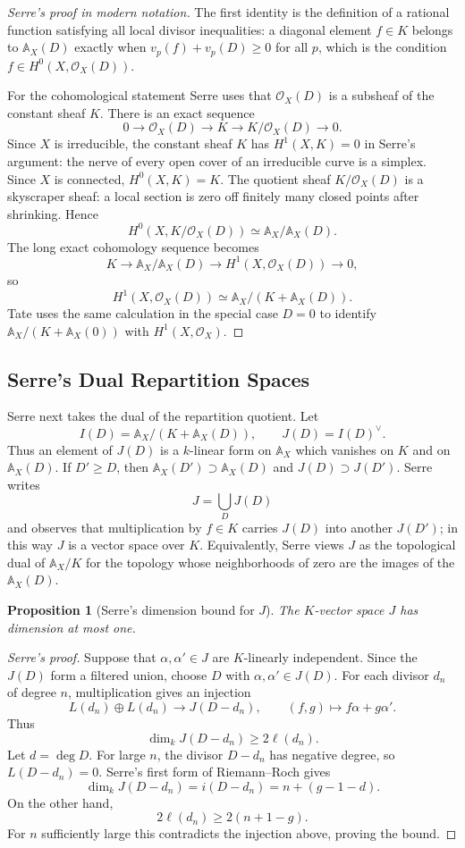 \documentclass[11pt,a4paper]{article}
\newcommand{\OO}{\mathcal O}
\newcommand{\AX}{\mathbb A_X}
\theoremstyle{definition}
\theoremstyle{plain}
\newtheorem{proposition}[definition]{Proposition}
\theoremstyle{remark}
\begin{document}
\begin{proof}[Serre's proof in modern notation]
The first identity is the definition of a rational function satisfying all local divisor inequalities: a diagonal element $f\in K$ belongs to $\AX(D)$ exactly when $v_p(f)+v_p(D)\ge0$ for all $p$, which is the condition $f\in H^0(X,\OO_X(D))$.

For the cohomological statement Serre uses that $\OO_X(D)$ is a subsheaf of the constant sheaf $K$.  There is an exact sequence
\[
  0\longrightarrow \OO_X(D)\longrightarrow K
  \longrightarrow K/\OO_X(D)\longrightarrow 0.
\]
Since $X$ is irreducible, the constant sheaf $K$ has $H^1(X,K)=0$ in Serre's argument: the nerve of every open cover of an irreducible curve is a simplex.  Since $X$ is connected, $H^0(X,K)=K$.  The quotient sheaf $K/\OO_X(D)$ is a skyscraper sheaf: a local section is zero off finitely many closed points after shrinking.  Hence
\[
  H^0(X,K/\OO_X(D))\simeq \AX/\AX(D).
\]
The long exact cohomology sequence becomes
\[
  K\longrightarrow \AX/\AX(D)
  \longrightarrow H^1(X,\OO_X(D))\longrightarrow 0,
\]
so
\[
  H^1(X,\OO_X(D))\simeq \AX/(K+\AX(D)).
\]
Tate uses the same calculation in the special case $D=0$ to identify $\AX/(K+\AX(0))$ with $H^1(X,\OO_X)$.
\end{proof}

\subsection{Serre's Dual Repartition Spaces}

Serre next takes the dual of the repartition quotient.  Let
\[
  I(D)=\AX/(K+\AX(D)),
  \qquad
  J(D)=I(D)^\vee.
\]
Thus an element of $J(D)$ is a $k$-linear form on $\AX$ which vanishes on $K$ and on $\AX(D)$.  If $D'\ge D$, then $\AX(D')\supset\AX(D)$ and $J(D)\supset J(D')$.  Serre writes
\[
  J=\bigcup_D J(D)
\]
and observes that multiplication by $f\in K$ carries $J(D)$ into another $J(D')$; in this way $J$ is a vector space over $K$.  Equivalently, Serre views $J$ as the topological dual of $\AX/K$ for the topology whose neighborhoods of zero are the images of the $\AX(D)$.

\begin{proposition}[Serre's dimension bound for $J$]
The $K$-vector space $J$ has dimension at most one.
\end{proposition}

\begin{proof}[Serre's proof]
Suppose that $\alpha,\alpha'\in J$ are $K$-linearly independent.  Since the $J(D)$ form a filtered union, choose $D$ with $\alpha,\alpha'\in J(D)$.  For each divisor $d_n$ of degree $n$, multiplication gives an injection
\[
  L(d_n)\oplus L(d_n)
  \longrightarrow J(D-d_n),
  \qquad (f,g)\longmapsto f\alpha+g\alpha'.
\]
Thus
\[
  \dim_k J(D-d_n)\ge 2\ell(d_n).
\]
Let $d=\deg D$.  For large $n$, the divisor $D-d_n$ has negative degree, so $L(D-d_n)=0$.  Serre's first form of Riemann--Roch gives
\[
  \dim_k J(D-d_n)=i(D-d_n)=n+(g-1-d).
\]
On the other hand,
\[
  2\ell(d_n)\ge 2(n+1-g).
\]
For $n$ sufficiently large this contradicts the injection above, proving the bound.
\end{proof}
\end{document}
